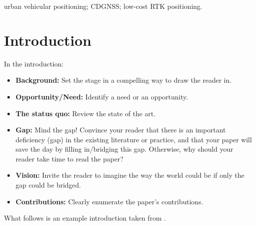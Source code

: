 \documentclass[10pt,journal,twocolumn]{IEEEtran} %
\begin{document}
\begin{IEEEkeywords} 
urban vehicular positioning; CDGNSS; low-cost RTK positioning.
\end{IEEEkeywords}

\newif\ifpreprint
\preprintfalse

\ifpreprint

\pagestyle{plain}
\thispagestyle{fancy}  
\fancyhf{} 
\renewcommand{\headrulewidth}{0pt}
\rfoot{\footnotesize \bf October 2020 preprint of paper submitted for review} \lfoot{\footnotesize \bf
  Copyright \copyright~2020 by Lakhsay Narula \\ and Todd E. Humphreys}

\else

\thispagestyle{empty}
\pagestyle{empty}

\fi


\section{Introduction}
In the introduction:
\begin{itemize}
\item {\bf Background:} Set the stage in a compelling way to draw the reader
  in.
\item {\bf Opportunity/Need:} Identify a need or an opportunity.
\item {\bf The status quo:} Review the state of the art.  
\item {\bf Gap:} Mind the gap!  Convince your reader that there is an
  important deficiency (gap) in the existing literature or practice, and that
  your paper will save the day by filling in/bridging this gap.  Otherwise,
  why should your reader take time to read the paper?
\item {\bf Vision:} Invite the reader to imagine the way the world could be if
  only the gap could be bridged.
\item {\bf Contributions:} Clearly enumerate the paper's contributions.
\end{itemize}

What follows is an example introduction taken from
\cite{humphreys2019deepUrbanIts}. \\ \\ 
\end{document}
